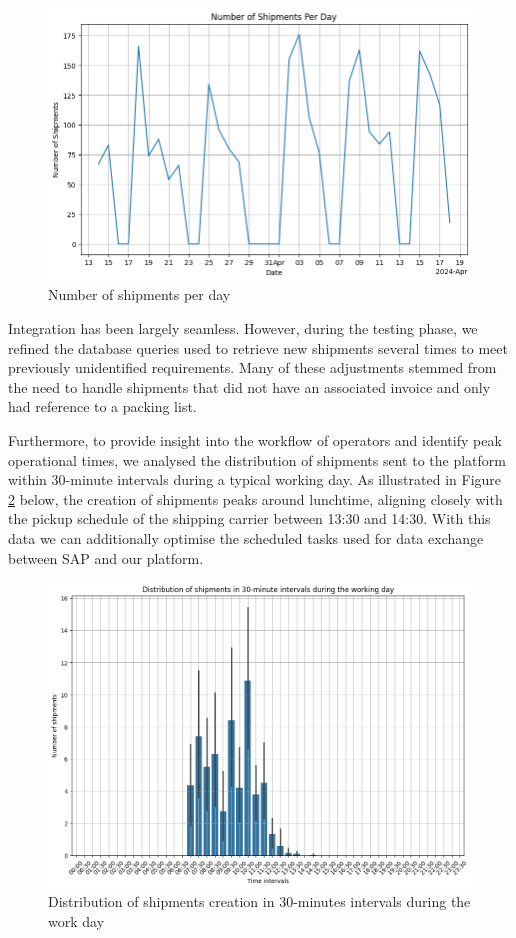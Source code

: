 \begin{figure}[H]\centering
\includegraphics[width=140mm]{img/chap08/shipment_per_day.png}
\caption{Number of shipments per day}
\label{img08:plot:shipment_per_day}
\end{figure}
Integration has been largely seamless. However, during the testing phase, we refined the database queries used to retrieve new shipments several times to meet previously unidentified requirements.
Many of these adjustments stemmed from the need to handle shipments that did not have an associated invoice and only had reference to a packing list.

Furthermore, to provide insight into the workflow of operators and identify peak operational times, we analysed the distribution of shipments sent to the platform within 30-minute intervals during a typical working day.
As illustrated in Figure \ref{img08:plot:shipment_distribution} below, the creation of shipments peaks around lunchtime, aligning closely with the pickup schedule of the shipping carrier between 13:30 and 14:30.
With this data we can additionally optimise the scheduled tasks used for data exchange between SAP and our platform.
\begin{figure}[H]\centering
\includegraphics[width=140mm]{img/chap08/shipments_time_intervals.png}
\caption{Distribution of shipments creation in 30-minutes intervals during the work day}
\label{img08:plot:shipment_distribution}
\end{figure}

